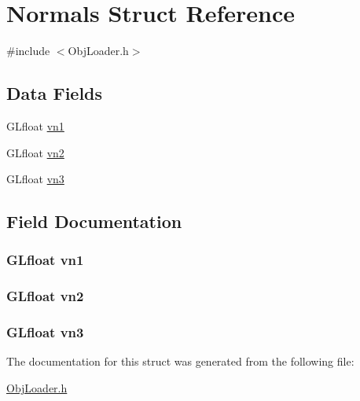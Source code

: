 \hypertarget{struct_normals}{\section{Normals Struct Reference}
\label{struct_normals}
}


{\ttfamily \#include $<$Obj\-Loader.\-h$>$}

\subsection*{Data Fields}
\begin{DoxyCompactItemize}
\item 
G\-Lfloat \hyperlink{struct_normals_a19cecd0e81d0d32b6e44958aeabb180e}{vn1}
\item 
G\-Lfloat \hyperlink{struct_normals_ab98ee6d8f1a05c9da3803241f0ac75ed}{vn2}
\item 
G\-Lfloat \hyperlink{struct_normals_a49287588c4950b8883dba84c503fa916}{vn3}
\end{DoxyCompactItemize}


\subsection{Field Documentation}
\hypertarget{struct_normals_a19cecd0e81d0d32b6e44958aeabb180e}{
\subsubsection[{vn1}]{\setlength{\rightskip}{0pt plus 5cm}G\-Lfloat vn1}}\label{struct_normals_a19cecd0e81d0d32b6e44958aeabb180e}
\hypertarget{struct_normals_ab98ee6d8f1a05c9da3803241f0ac75ed}{
\subsubsection[{vn2}]{\setlength{\rightskip}{0pt plus 5cm}G\-Lfloat vn2}}\label{struct_normals_ab98ee6d8f1a05c9da3803241f0ac75ed}
\hypertarget{struct_normals_a49287588c4950b8883dba84c503fa916}{
\subsubsection[{vn3}]{\setlength{\rightskip}{0pt plus 5cm}G\-Lfloat vn3}}\label{struct_normals_a49287588c4950b8883dba84c503fa916}


The documentation for this struct was generated from the following file\-:\begin{DoxyCompactItemize}
\item 
\hyperlink{_obj_loader_8h}{Obj\-Loader.\-h}\end{DoxyCompactItemize}
